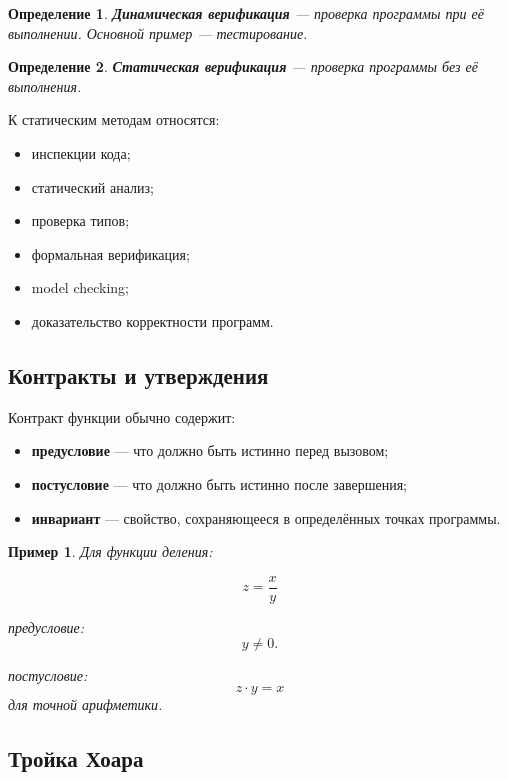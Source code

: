 \documentclass[12pt,a4paper]{article}
\newtheorem{definition}{Определение}
\newtheorem{example}{Пример}
\begin{document}
\begin{definition}
\textbf{Динамическая верификация} --- проверка программы при её выполнении. Основной пример --- тестирование.
\end{definition}

\begin{definition}
\textbf{Статическая верификация} --- проверка программы без её выполнения.
\end{definition}

К статическим методам относятся:

\begin{itemize}
    \item инспекции кода;
    \item статический анализ;
    \item проверка типов;
    \item формальная верификация;
    \item model checking;
    \item доказательство корректности программ.
\end{itemize}

\subsection{Контракты и утверждения}

Контракт функции обычно содержит:

\begin{itemize}
    \item \textbf{предусловие} --- что должно быть истинно перед вызовом;
    \item \textbf{постусловие} --- что должно быть истинно после завершения;
    \item \textbf{инвариант} --- свойство, сохраняющееся в определённых точках программы.
\end{itemize}

\begin{example}
Для функции деления:

\[
z = \frac{x}{y}
\]

предусловие:
\[
y \neq 0.
\]

постусловие:
\[
z \cdot y = x
\]
для точной арифметики.
\end{example}

\subsection{Тройка Хоара}
\end{document}
